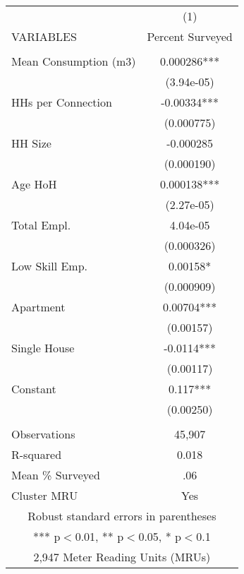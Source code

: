 \begin{tabular}{lc} \hline
 & (1) \\
VARIABLES & Percent Surveyed \\ \hline
 &  \\
Mean Consumption (m3) & 0.000286*** \\
 & (3.94e-05) \\
HHs per Connection & -0.00334*** \\
 & (0.000775) \\
HH Size & -0.000285 \\
 & (0.000190) \\
Age HoH & 0.000138*** \\
 & (2.27e-05) \\
Total Empl. & 4.04e-05 \\
 & (0.000326) \\
Low Skill Emp. & 0.00158* \\
 & (0.000909) \\
Apartment & 0.00704*** \\
 & (0.00157) \\
Single House & -0.0114*** \\
 & (0.00117) \\
Constant & 0.117*** \\
 & (0.00250) \\
 &  \\
Observations & 45,907 \\
R-squared & 0.018 \\
Mean \% Surveyed & .06 \\
 Cluster MRU & Yes \\ \hline
\multicolumn{2}{c}{ Robust standard errors in parentheses} \\
\multicolumn{2}{c}{ *** p$<$0.01, ** p$<$0.05, * p$<$0.1} \\
\multicolumn{2}{c}{ 2,947 Meter Reading Units (MRUs)} \\
\end{tabular}
